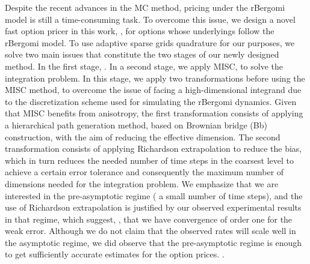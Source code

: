 Despite the recent advances in the MC method, pricing under the rBergomi model is still a time-consuming task. To overcome this issue,  we design  a novel fast option pricer in this work,  , for options whose underlyings  follow the rBergomi model.  To use adaptive sparse grids quadrature for our purposes, we  solve two main issues that constitute the two stages of our newly designed method. In the first stage, .   In a second stage, we apply  MISC, to solve the integration problem. In this stage, we apply two transformations before using the MISC method, to overcome the issue of facing a high-dimensional integrand due to the discretization scheme used for simulating the rBergomi dynamics. Given that MISC benefits from anisotropy, the first transformation consists of applying a hierarchical  path generation method, based on Brownian
bridge (Bb) construction, with the aim of reducing the effective dimension. The second transformation consists of applying Richardson extrapolation to reduce the bias, which in turn reduces the needed number of time steps in the coarsest level to achieve a certain error tolerance and consequently  the maximum number of dimensions needed for the integration problem. We emphasize that we are interested in  the pre-asymptotic regime ( a small number of time steps), and  the use of Richardson extrapolation is justified by our observed experimental results in that regime,  which suggest, , that we have convergence of order one for the weak error. Although we do not claim that the observed rates will scale well in the asymptotic regime, we did observe that the pre-asymptotic regime is enough to get sufficiently accurate estimates for the option prices.  . 

